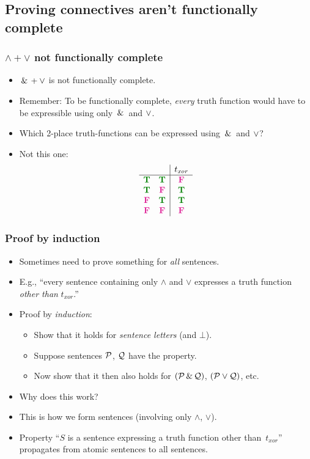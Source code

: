 \subsection{Proving connectives aren't functionally complete}

\begin{frame}
  \frametitle{$\land + \lor$ not functionally complete}

\begin{itemize}[<+->]
\item $\,\&\, + \vee$ is not functionally complete.
\item Remember: To be functionally complete, \emph{every} truth
  function would have to be expressible using only $\,\&\,$ and $\vee$.
\item Which 2-place truth-functions can be expressed using $\,\&\,$ and
  $\vee$?
\item Not this one:
\[
\begin{array}{cc|c}
  && t_{\mathit{xor}}\\ \hline
\True & \True & \False \\
\True & \False & \True \\
\False & \True & \True \\
\False & \False & \False
\end{array}
\]
\end{itemize}
\end{frame}

\begin{frame}
    \frametitle{Proof by induction}

\begin{itemize}[<+->]
\item Sometimes need to prove something for \emph{all} sentences.
\item E.g., ``every sentence containing only $\land$ and $\lor$ expresses a truth function \emph{other than} $t_\mathit{xor}$.''
\item Proof by \emph{induction}:
\begin{itemize}[<+->]
\item Show that it holds for \emph{sentence letters} (and $\bot$).
\item Suppose sentences \emph{$\mathcal{P}$}, \emph{$\mathcal{Q}$} have the property.
\item Now show that it then also holds for \emph{$(\mathcal{P} \,\&\, \mathcal{Q})$}, \emph{$(\mathcal{P} \vee \mathcal{Q})$}, etc.
\end{itemize}
\item Why does this work? 
\item This is how we form sentences (involving only $\land$, $\lor$).
\item Property ``$S$ is a sentence expressing a truth function other than~$t_\mathit{xor}$'' propagates from atomic sentences to all sentences.
\end{itemize}
\end{frame}

